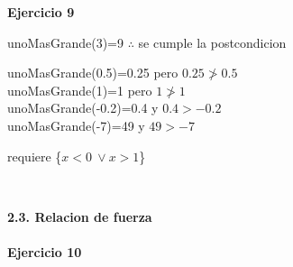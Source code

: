 \documentclass{article}
\begin{document}
\LARGE{\textbf{Ejercicio 9}}\\
\begin{itemize}\Large{
    \item [a) ] unoMasGrande(3)=9 $\therefore$ se cumple la postcondicion
    \item [b) ] unoMasGrande(0.5)=0.25 pero $0.25\ngtr0.5$ \\
    unoMasGrande(1)=1 pero $1\ngtr1$\\
    unoMasGrande(-0.2)=0.4 y $0.4>-0.2$\\
    unoMasGrande(-7)=49 y $49>-7$\\
    \item[c) ]  requiere \{$x<0\ \lor x>1$\}}\\
\end{itemize}
\noindent\huge{\textbf{2.3. Relacion de fuerza}}\\\\
\LARGE{\textbf{Ejercicio 10}}\\
\end{document}
